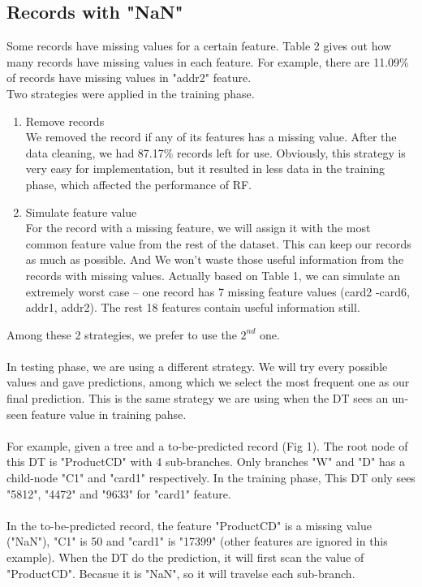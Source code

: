 \documentclass{article}
\begin{document}
\subsection{Records with "NaN"}
Some records have missing values for a certain feature. Table 2 gives out how many records have missing values in each feature. For example, there are 11.09\% of records have missing values in "addr2" feature.\\
Two strategies were applied in the training phase.
\begin{enumerate}
    \item Remove records
    \\We removed the record if any of its features has a missing value. After the data cleaning, we had 87.17\% records left for use. Obviously, this strategy is very easy for implementation, but it resulted in less data in the training phase, which affected the performance of RF.
    \item Simulate feature value
    \\For the record with a missing feature, we will assign it with the most common feature value from the rest of the dataset. This can keep our records as much as possible. And We won't waste those useful information from the records with missing values. Actually based on Table 1, we can simulate an extremely worst case -- one record has 7 missing feature values (card2 -card6, addr1, addr2). The rest 18 features contain useful information still.
\end{enumerate}
Among these 2 strategies, we prefer to use the $2^{nd}$ one.\\\\
In testing phase, we are using a different strategy. We will try every possible values and gave predictions, among which we select the most frequent one as our final prediction. This is the same strategy we are using when the DT sees an un-seen feature value in training pahse.\\\\
For example, given a tree and a to-be-predicted record (Fig 1). The root node of this DT is "ProductCD" with 4 sub-branches. Only branches "W" and "D" has a child-node "C1" and "card1" respectively. In the training phase, This DT only sees "5812", "4472" and "9633" for "card1" feature.\\\\  
In the to-be-predicted record, the feature "ProductCD" is a missing value ("NaN"), "C1" is 50 and "card1" is "17399" (other features are ignored in this example). When the DT do the prediction, it will first scan the value of "ProductCD". Becasue it is "NaN", so it will travelse each sub-branch. 
\end{document}
